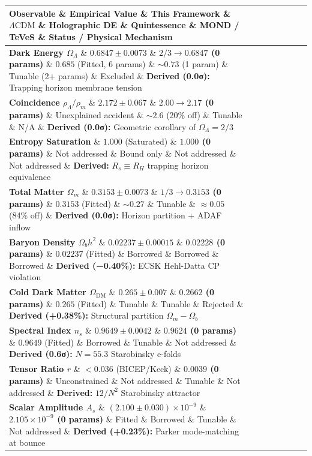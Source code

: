 \documentclass[11pt,a4paper]{article}
\theoremstyle{definition}\newtheorem{definition}{Definition}
\theoremstyle{remark}\newtheorem{remark}{Remark}
\begin{document}
\begin{longtable}{llllllll}
\hline
Observable \& Empirical Value \& This Framework \& $\Lambda\text{CDM}$ \& Holographic DE \& Quintessence \& MOND / TeVeS \& Status / Physical Mechanism \\
\hline
\textbf{Dark Energy $\Omega_\Lambda$} \& $0.6847 \pm 0.0073$ \& \textbf{$2/3 \to 0.6847$ (0 params)} \& $0.685$ (Fitted, 6 params) \& $\sim 0.73$ (1 param) \& Tunable (2+ params) \& Excluded \& \textbf{Derived (0.0σ):} Trapping horizon membrane tension \\
\textbf{Coincidence $\rho_\Lambda / \rho_m$} \& $2.172 \pm 0.067$ \& \textbf{$2.00 \to 2.17$ (0 params)} \& Unexplained accident \& $\sim 2.6$ (20\% off) \& Tunable \& N/A \& \textbf{Derived (0.0σ):} Geometric corollary of $\Omega_\Lambda = 2/3$ \\
\textbf{Entropy Saturation} \& $1.000$ (Saturated) \& \textbf{$1.000$ (0 params)} \& Not addressed \& Bound only \& Not addressed \& Not addressed \& \textbf{Derived:} $R_s \equiv R_H$ trapping horizon equivalence \\
\textbf{Total Matter $\Omega_m$} \& $0.3153 \pm 0.0073$ \& \textbf{$1/3 \to 0.3153$ (0 params)} \& $0.3153$ (Fitted) \& $\sim 0.27$ \& Tunable \& $\approx 0.05$ (84\% off) \& \textbf{Derived (0.0σ):} Horizon partition + ADAF inflow \\
\textbf{Baryon Density $\Omega_b h^2$} \& $0.02237 \pm 0.00015$ \& \textbf{$0.02228$ (0 params)} \& $0.02237$ (Fitted) \& Borrowed \& Borrowed \& Borrowed \& \textbf{Derived (−0.40\%):} ECSK Hehl-Datta CP violation \\
\textbf{Cold Dark Matter $\Omega_{\text{DM}}$} \& $0.265 \pm 0.007$ \& \textbf{$0.2662$ (0 params)} \& $0.265$ (Fitted) \& Tunable \& Tunable \& Rejected \& \textbf{Derived (+0.38\%):} Structural partition $\Omega_m - \Omega_b$ \\
\textbf{Spectral Index $n_s$} \& $0.9649 \pm 0.0042$ \& \textbf{$0.9624$ (0 params)} \& $0.9649$ (Fitted) \& Borrowed \& Tunable \& Not addressed \& \textbf{Derived (0.6σ):} $N = 55.3$ Starobinsky e-folds \\
\textbf{Tensor Ratio $r$} \& $< 0.036$ (BICEP/Keck) \& \textbf{$0.0039$ (0 params)} \& Unconstrained \& Not addressed \& Tunable \& Not addressed \& \textbf{Derived:} $12/N^2$ Starobinsky attractor \\
\textbf{Scalar Amplitude $A_s$} \& $(2.100 \pm 0.030) \times 10^{-9}$ \& \textbf{$2.105 \times 10^{-9}$ (0 params)} \& Fitted \& Borrowed \& Tunable \& Not addressed \& \textbf{Derived (+0.23\%):} Parker mode-matching at bounce \\

\end{longtable}
\end{document}
